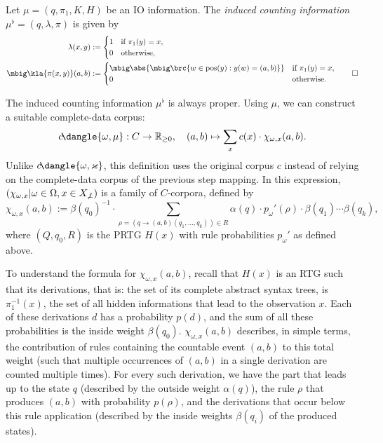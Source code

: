 \begin{definition}
 Let $\mu=(q,\pi_1,K,H)$ be an IO information. The \emph{induced counting
 information} $\mu^\flat = (q,\lambda,\pi)$ is given by
 \begin{align*}
  \lambda(x,y) &:= \begin{cases}
   1 & \text{if } \pi_1(y) = x, \\
   0 & \text{otherwise},
  \end{cases} \\
  \mbig\kla{\pi(x,y)}(a,b) &:= \begin{cases}
   \mbig\abs{\mbig\brc{w\in\pos(y): y(w)=(a,b)}} & \text{if } \pi_1(y) = x, \\
   0 & \text{otherwise}.
  \end{cases}
  \qedhere
 \end{align*}
\end{definition}
The induced counting information $\mu^\flat$ is always proper.
\cite[p.~15]{bucstuvog15} Using $\mu$, we can construct a suitable complete-data corpus:
\[
 c\!\dangle{\omega,\mu}: C\to\zr_{\geq0}, \quad
 (a,b) \mapsto \sum_x c(x) \cdot \chi_{\omega,x}(a,b).
\]
Unlike $c\!\dangle{\omega,\varkappa}$, this definition uses the original corpus
$c$ instead of relying on the complete-data corpus of the previous step
mapping. In this expression, $(\chi_{\omega,x}|\omega\in\Omega,x\in
X_{\not\bot})$ is a family of $C$-corpora, defined by
\begin{equation}\label{eq:02-chi}
 \chi_{\omega,x}(a,b) := \beta(q_0)^{-1} \cdot \sum_{\rho = (q\to(a,b)(q_1,\ldots,q_k))\in R} \alpha(q) \cdot p_\omega'(\rho) \cdot \beta(q_1) \cdots \beta(q_k),
\end{equation}
where $(Q,q_0,R)$ is the PRTG $H(x)$ with rule probabilities $p_\omega'$ as defined above.

To understand the formula for $\chi_{\omega,x}(a,b)$, recall that $H(x)$ is an
RTG such that its derivations, that is: the set of its complete abstract syntax
trees, is $\pi_1^{-1}(x)$, the set of all hidden informations that lead to the
observation $x$. Each of these derivations $d$ has a probability $p(d)$, and
the sum of all these probabilities is the inside weight $\beta(q_0)$.
$\chi_{\omega,x}(a,b)$ describes, in simple terms, the contribution of rules
containing the countable event $(a,b)$ to this total weight (such that
multiple occurrences of $(a,b)$ in a single derivation are counted multiple
times). For every such derivation, we have the part that leads up to the state
$q$ (described by the outside weight $\alpha(q)$), the rule $\rho$ that
produces $(a,b)$ with probability $p(\rho)$, and the derivations that occur
below this rule application (described by the inside weights $\beta(q_i)$ of
the produced states).

